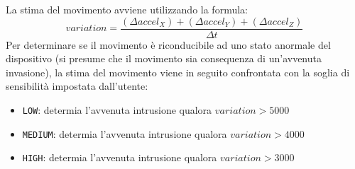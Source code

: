 La stima del movimento avviene utilizzando la formula:
\[variation = \frac{(\Delta accel_X) + (\Delta accel_Y) + (\Delta accel_Z)}{\Delta t}\]
Per determinare se il movimento è riconducibile ad uno stato anormale del dispositivo (si presume che il movimento sia consequenza di un'avvenuta invasione), la stima del movimento viene in seguito confrontata con la soglia di sensibilità impostata dall'utente:
\begin{itemize}
  \item \texttt{LOW}: determia l'avvenuta intrusione qualora $variation >  5000$
  \item \texttt{MEDIUM}: determia l'avvenuta intrusione qualora $variation > 4000$
  \item \texttt{HIGH}: determia l'avvenuta intrusione qualora $variation > 3000$
\end{itemize}~\\

